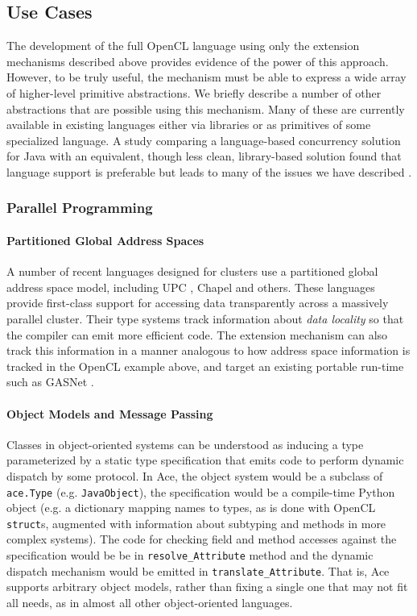 \documentclass[9pt,preprint]{sigplanconf}
\begin{document}
\subsection{Use Cases}\label{usecases}
The development of the full OpenCL language using only the extension mechanisms described above provides evidence of the power of this approach. However, to be truly useful, the mechanism must be able to express a wide array of higher-level primitive abstractions. We briefly describe a number of other abstractions that are possible using this mechanism. Many of these are currently available in existing languages either via libraries or as primitives of some specialized language. A study comparing a language-based concurrency solution for Java with an equivalent, though less clean, library-based solution found that language support is preferable but leads to many of the issues we have described \cite{cave2010comparing}.

\subsubsection{Parallel Programming}
\paragraph{Partitioned Global Address Spaces}
A number of recent languages designed for clusters use a partitioned global address space model, including UPC \cite{upc}, Chapel \cite{chapel} and others. These languages provide first-class support for accessing data transparently across a massively parallel cluster. Their type systems track information about \emph{data locality} so that the compiler can emit more efficient code. The extension mechanism can also track this information in a manner analogous to how address space information is tracked in the OpenCL example above, and target an existing portable run-time such as GASNet \cite{bonachea2002gasnet}.

\paragraph{Object Models and Message Passing}
Classes in object-oriented systems can be understood as inducing a type parameterized by a static type specification that emits code to perform dynamic dispatch by some protocol. In Ace, the object system would be a subclass of \verb|ace.Type| (e.g. \verb|JavaObject|), the specification would be a compile-time Python object (e.g. a dictionary mapping names to types, as is done with OpenCL \verb|struct|s, augmented with information about subtyping and methods in more complex systems). The code for checking field and method accesses against the specification would be be in \verb|resolve_Attribute| method and the dynamic dispatch mechanism would be emitted in \verb|translate_Attribute|. That is, Ace supports arbitrary object models, rather than fixing a single one that may not fit all needs, as in almost all other object-oriented languages.
\end{document}
